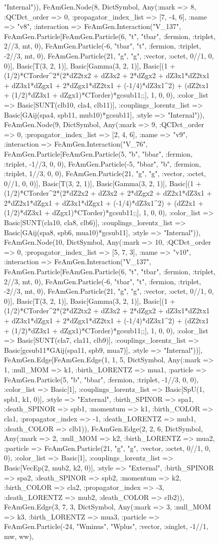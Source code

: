 \documentclass{revtex4}
\begin{document}
\begin{figure}[!htb]
\begin{center}
{"Internal")), FeAmGen.Node(8, Dict{Symbol, Any}(:mark => 8, :QCDct_order => 0, :propagator_index_list => [7, -4, 6], :name => "v8", :interaction => FeAmGen.Interaction("V_137", FeAmGen.Particle[FeAmGen.Particle(6, "t", "tbar", :fermion, :triplet, 2//3, mt, 0), FeAmGen.Particle(-6, "tbar", "t", :fermion, :triplet, -2//3, mt, 0), FeAmGen.Particle(21, "g", "g", :vector, :octet, 0//1, 0, 0)], Basic[T(3, 2, 1)], Basic[Gamma(3, 2, 1)], Basic[(1 + (1/2)*CTorder^2*(2*dZ2tx2 + dZ3x2 + 2*dZgx2 + dZ3x1*dZ2tx1 + dZ3x1*dZgx1 + 2*dZgx1*dZ2tx1 + (-1/4)*dZ3x1^2) + (dZ2tx1 + (1/2)*dZ3x1 + dZgx1)*CTorder)*gcsub11;;], 1, 0, 0), :color_list => Basic[SUNT(clb10, cla4, clb11)], :couplings_lorentz_list => Basic[GAij(spa4, spb11, mub10)*gcsub11], :style => "Internal")), FeAmGen.Node(9, Dict{Symbol, Any}(:mark => 9, :QCDct_order => 0, :propagator_index_list => [2, 4, 6], :name => "v9", :interaction => FeAmGen.Interaction("V_76", FeAmGen.Particle[FeAmGen.Particle(5, "b", "bbar", :fermion, :triplet, -1//3, 0, 0), FeAmGen.Particle(-5, "bbar", "b", :fermion, :triplet, 1//3, 0, 0), FeAmGen.Particle(21, "g", "g", :vector, :octet, 0//1, 0, 0)], Basic[T(3, 2, 1)], Basic[Gamma(3, 2, 1)], Basic[(1 + (1/2)*CTorder^2*(2*dZ2x2 + dZ3x2 + 2*dZgx2 + dZ2x1*dZ3x1 + 2*dZ2x1*dZgx1 + dZ3x1*dZgx1 + (-1/4)*dZ3x1^2) + (dZ2x1 + (1/2)*dZ3x1 + dZgx1)*CTorder)*gcsub11;;], 1, 0, 0), :color_list => Basic[SUNT(cla10, cla8, clb6)], :couplings_lorentz_list => Basic[GAij(spa8, spb6, mua10)*gcsub11], :style => "Internal")), FeAmGen.Node(10, Dict{Symbol, Any}(:mark => 10, :QCDct_order => 0, :propagator_index_list => [5, 7, 3], :name => "v10", :interaction => FeAmGen.Interaction("V_137", FeAmGen.Particle[FeAmGen.Particle(6, "t", "tbar", :fermion, :triplet, 2//3, mt, 0), FeAmGen.Particle(-6, "tbar", "t", :fermion, :triplet, -2//3, mt, 0), FeAmGen.Particle(21, "g", "g", :vector, :octet, 0//1, 0, 0)], Basic[T(3, 2, 1)], Basic[Gamma(3, 2, 1)], Basic[(1 + (1/2)*CTorder^2*(2*dZ2tx2 + dZ3x2 + 2*dZgx2 + dZ3x1*dZ2tx1 + dZ3x1*dZgx1 + 2*dZgx1*dZ2tx1 + (-1/4)*dZ3x1^2) + (dZ2tx1 + (1/2)*dZ3x1 + dZgx1)*CTorder)*gcsub11;;], 1, 0, 0), :color_list => Basic[SUNT(cla7, cla11, clb9)], :couplings_lorentz_list => Basic[gcsub11*GAij(spa11, spb9, mua7)], :style => "Internal"))], FeAmGen.Edge[FeAmGen.Edge(1, 1, 5, Dict{Symbol, Any}(:mark => 1, :null_MOM => k1, :birth_LORENTZ => mua1, :particle => FeAmGen.Particle(5, "b", "bbar", :fermion, :triplet, -1//3, 0, 0), :color_list => Basic[1], :couplings_lorentz_list => Basic[SpU(1, spb1, k1, 0)], :style => "External", :birth_SPINOR => spa1, :death_SPINOR => spb1, :momentum => k1, :birth_COLOR => cla1, :propagator_index => -1, :death_LORENTZ => mub1, :death_COLOR => clb1)), FeAmGen.Edge(2, 2, 6, Dict{Symbol, Any}(:mark => 2, :null_MOM => k2, :birth_LORENTZ => mua2, :particle => FeAmGen.Particle(21, "g", "g", :vector, :octet, 0//1, 0, 0), :color_list => Basic[1], :couplings_lorentz_list => Basic[VecEp(2, mub2, k2, 0)], :style => "External", :birth_SPINOR => spa2, :death_SPINOR => spb2, :momentum => k2, :birth_COLOR => cla2, :propagator_index => -3, :death_LORENTZ => mub2, :death_COLOR => clb2)), FeAmGen.Edge(3, 7, 3, Dict{Symbol, Any}(:mark => 3, :null_MOM => k3, :birth_LORENTZ => mua3, :particle => FeAmGen.Particle(-24, "Wminus", "Wplus", :vector, :singlet, -1//1, mw, ww), }
\end{center}
\end{figure}
\end{document}
